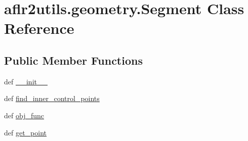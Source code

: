 \hypertarget{classaflr2utils_1_1geometry_1_1Segment}{\section{aflr2utils.\-geometry.\-Segment Class Reference}
\label{classaflr2utils_1_1geometry_1_1Segment}
}
\subsection*{Public Member Functions}
\begin{DoxyCompactItemize}
\item 
def \hyperlink{classaflr2utils_1_1geometry_1_1Segment_aa39965fd9aa319a186c913707b319010}{\-\_\-\-\_\-init\-\_\-\-\_\-}
\item 
def \hyperlink{classaflr2utils_1_1geometry_1_1Segment_ac07f3bb57f6d4256839a3de7139946d8}{find\-\_\-inner\-\_\-control\-\_\-points}
\item 
def \hyperlink{classaflr2utils_1_1geometry_1_1Segment_aff213a3bcdc0d1411b95cee7c106352c}{obj\-\_\-func}
\item 
def \hyperlink{classaflr2utils_1_1geometry_1_1Segment_a359125e7c2e72b6ad8cac81854bee928}{get\-\_\-point}
\end{DoxyCompactItemize}
